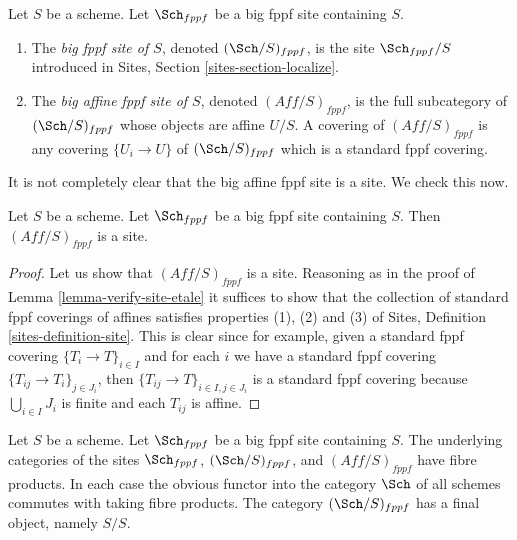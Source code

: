 \begin{definition}
\label{definition-big-small-fppf}
Let $S$ be a scheme. Let $\Sch_{fppf}$ be a big fppf
site containing $S$.
\begin{enumerate}
\item The {\it big fppf site of $S$}, denoted
$(\Sch/S)_{fppf}$, is the site $\Sch_{fppf}/S$
introduced in Sites, Section \ref{sites-section-localize}.
\item The {\it big affine fppf site of $S$}, denoted
$(\textit{Aff}/S)_{fppf}$, is the full subcategory of
$(\Sch/S)_{fppf}$ whose objects are affine $U/S$.
A covering of $(\textit{Aff}/S)_{fppf}$ is any covering
$\{U_i \to U\}$ of $(\Sch/S)_{fppf}$ which is a
standard fppf covering.
\end{enumerate}
\end{definition}

\noindent
It is not completely clear that
the big affine fppf site is a site. We check this now.

\begin{lemma}
\label{lemma-verify-site-fppf}
Let $S$ be a scheme. Let $\Sch_{fppf}$ be a big fppf
site containing $S$. Then $(\textit{Aff}/S)_{fppf}$ is a site.
\end{lemma}

\begin{proof}
Let us show that $(\textit{Aff}/S)_{fppf}$ is a site.
Reasoning as in the proof of Lemma \ref{lemma-verify-site-etale}
it suffices to show that the collection
of standard fppf coverings of affines satisfies properties
(1), (2) and (3) of
Sites, Definition \ref{sites-definition-site}.
This is clear since for example, given a standard fppf
covering $\{T_i \to T\}_{i\in I}$ and for each
$i$ we have a standard fppf covering $\{T_{ij} \to T_i\}_{j\in J_i}$, then
$\{T_{ij} \to T\}_{i \in I, j\in J_i}$ is a standard fppf covering
because $\bigcup_{i\in I} J_i$ is finite and each $T_{ij}$ is affine.
\end{proof}

\begin{lemma}
\label{lemma-fibre-products-fppf}
Let $S$ be a scheme. Let $\Sch_{fppf}$ be a big fppf
site containing $S$. The underlying categories of the sites
$\Sch_{fppf}$, $(\Sch/S)_{fppf}$,
and $(\textit{Aff}/S)_{fppf}$ have fibre products.
In each case the obvious functor into the category $\Sch$ of
all schemes commutes with taking fibre products. The category
$(\Sch/S)_{fppf}$ has a final object, namely $S/S$.
\end{lemma}

